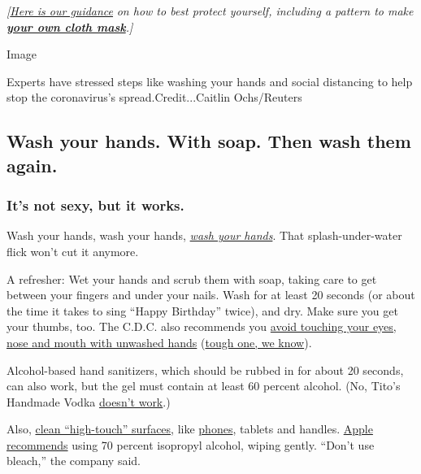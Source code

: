 \emph{{[}}\href{https://www.nytimes3xbfgragh.onion/article/coronavirus-N95-mask-DIY-face-mask-health.html}{\emph{Here
is our guidance}} \emph{on how to best protect yourself, including a
pattern to make}
\textbf{\href{https://www.nytimes3xbfgragh.onion/article/how-to-make-face-mask-coronavirus.html}{\emph{your
own cloth mask}}}\emph{.{]}}

Image

Experts have stressed steps like washing your hands and social
distancing to help stop the coronavirus's spread.Credit...Caitlin
Ochs/Reuters

\hypertarget{wash-your-hands-with-soap-then-wash-them-again}{%
\subsection{Wash your hands. With soap. Then wash them
again.}\label{wash-your-hands-with-soap-then-wash-them-again}}

\hypertarget{its-not-sexy-but-it-works}{%
\subsubsection{It's not sexy, but it
works.}\label{its-not-sexy-but-it-works}}

Wash your hands, wash your hands,
\href{https://www.nytimes3xbfgragh.onion/2020/03/13/world/how-to-wash-your-hands-coronavirus.html}{\emph{wash
your hands}}. That splash-under-water flick won't cut it anymore.

A refresher: Wet your hands and scrub them with soap, taking care to get
between your fingers and under your nails. Wash for at least 20 seconds
(or about the time it takes to sing ``Happy Birthday'' twice), and dry.
Make sure you get your thumbs, too. The C.D.C. also recommends you
\href{https://www.cdc.gov/coronavirus/2019-ncov/hcp/guidance-prevent-spread.html}{avoid
touching your eyes, nose and mouth with unwashed hands}
(\href{https://www.nytimes3xbfgragh.onion/2020/03/05/health/stop-touching-your-face-coronavirus.html}{tough
one, we know}).

Alcohol-based hand sanitizers, which should be rubbed in for about 20
seconds, can also work, but the gel must contain at least 60 percent
alcohol. (No, Tito's Handmade Vodka
\href{https://www.cnn.com/2020/03/05/us/titos-vodka-coronavirus-trnd/index.html}{doesn't
work}.)

Also,
\href{https://www.cdc.gov/coronavirus/2019-ncov/hcp/guidance-prevent-spread.html}{clean
``high-touch'' surfaces}, like
\href{https://www.nytimes3xbfgragh.onion/2020/03/12/smarter-living/clean-your-phone.html}{phones},
tablets and handles.
\href{https://support.apple.com/en-us/HT204172?mod=article_inline}{Apple
recommends} using 70 percent isopropyl alcohol, wiping gently. ``Don't
use bleach,'' the company said.

